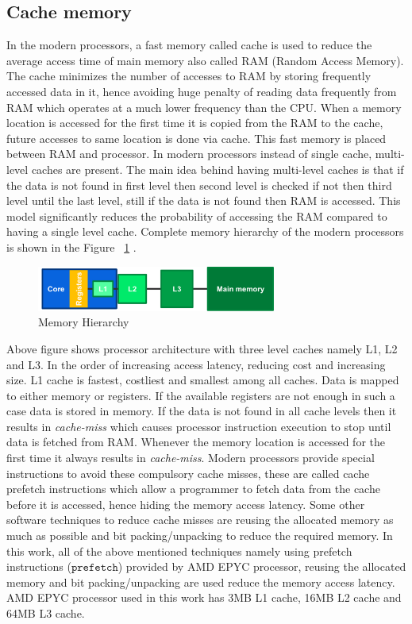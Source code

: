 \subsection{Cache memory} \label{cacheSection}
In the modern processors, a fast memory called cache is used to reduce the average access time of main memory also called RAM (Random Access Memory). The cache minimizes the number of accesses to RAM by storing frequently accessed data in it, hence avoiding huge penalty of reading data frequently from RAM which operates at a much lower frequency than the CPU. When a memory location is accessed for the first time it is copied from the RAM to the cache, future accesses to same location is done via cache. This fast memory is placed between RAM and processor. In modern processors instead of single cache, multi-level caches are present. The main idea behind having multi-level caches is that if the data is not found in first level then second level is checked if not then third level until the last level, still if the data is not found then RAM is accessed. This model significantly reduces the probability of accessing the RAM compared to having a single level cache. Complete memory hierarchy of the modern processors is shown in the Figure  ~\ref{fig:memoryHierarchy} \cite{CMP}.

\begin{figure}[h]
	\centering
	\includegraphics[width=0.7\textwidth]{./figures/memoryHierarchy.pdf}
	\caption{Memory Hierarchy}
	\label{fig:memoryHierarchy}
\end{figure}

Above figure shows processor architecture with three level caches namely L1, L2 and L3. In the order of increasing access latency, reducing cost and increasing size. L1 cache is fastest, costliest and smallest among all caches. Data is mapped to either memory or registers. If the available registers are not enough in such a case data is stored in memory. If the data is not found in all cache levels then it results in \emph{cache-miss} which causes processor instruction execution to stop until data is fetched from RAM. Whenever the memory location is accessed for the first time it always results in \emph{cache-miss}. Modern processors provide special instructions to avoid these compulsory cache misses, these are called cache prefetch instructions which allow a programmer to fetch data from the cache before it is accessed, hence hiding the memory access latency. Some other software techniques to reduce cache misses are reusing the allocated memory as much as possible and bit packing/unpacking to reduce the required memory. In this work, all of the above mentioned techniques namely using prefetch instructions ($\mathtt{prefetch}$) provided by AMD EPYC processor, reusing the allocated memory and bit packing/unpacking are used reduce the memory access latency. AMD EPYC processor used in this work has 3MB L1 cache, 16MB L2 cache and 64MB L3 cache.

